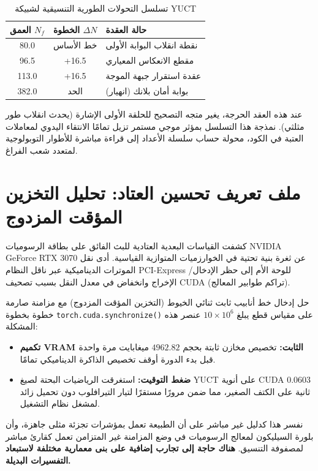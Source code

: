 \documentclass[11pt,a4paper]{article}
\begin{document}
	\begin{table}[h!]
		\centering
		\caption{تسلسل التحولات الطورية التنسيقية لشبيكة YUCT}
		\label{tab:phase_transitions}
		\small
		\begin{tabular}{ccl}
			\toprule
			\textbf{العمق $N_f$} & \textbf{الخطوة $\Delta N$} & \textbf{حالة العقدة} \\
			\midrule
			80.0  & خط الأساس & نقطة انقلاب البوابة الأولى \\
			96.5  & +16.5 & مقطع الانعكاس المعياري \\
			113.0 & +16.5 & عقدة استقرار جبهة الموجة \\
			382.0 & الحد  & بوابة أمان بلانك (انهيار) \\
			\bottomrule
		\end{tabular}
	\end{table}
	
	عند هذه العقد الحرجة، يغير متجه التصحيح للحلقة الأولى الإشارة (يحدث انقلاب طور مثلثي). نمذجة هذا التسلسل بمؤثر موجي مستمر تزيل تمامًا الانتقاء اليدوي لمعاملات العتبة في الكود، محولة حساب سلسلة الأعداد إلى قراءة مباشرة للأطوار التوبولوجية لمتعدد شعب الفراغ.
	
	\section{ملف تعريف تحسين العتاد: تحليل التخزين المؤقت المزدوج}
	كشفت القياسات البعدية العتادية للبث الفائق على بطاقة الرسوميات NVIDIA GeForce RTX 3070 عن ثغرة بنية تحتية في الخوارزميات المتوازية القياسية. أدى نقل الموترات الديناميكية عبر ناقل النظام PCI-Express للوحة الأم إلى حظر الإدخال/الإخراج وانخفاض في معدل النقل بسبب تصحيف CUDA (تراكم طوابير المعالج).
	
	حل إدخال خط أنابيب ثابت ثنائي الخيوط (التخزين المؤقت المزدوج) مع مزامنة صارمة خطوة بخطوة \texttt{torch.cuda.synchronize()} على مقياس قطع يبلغ $10 \times 10^6$ عنصر هذه المشكلة:
	\begin{itemize}
		\item \textbf{تكميم VRAM الثابت:} تخصيص مخازن ثابتة بحجم $4962.82$ ميغابايت مرة واحدة قبل بدء الدورة أوقف تخصيص الذاكرة الديناميكي تمامًا.
		\item \textbf{ضغط التوقيت:} استغرقت الرياضيات البحتة لصيغ YUCT على أنوية CUDA $0.0603$ ثانية على الكتف الصغير، مما ضمن مرورًا مستقرًا لتيار التيرافلوب دون تحميل زائد لمشغل نظام التشغيل.
	\end{itemize}
	نفسر هذا كدليل غير مباشر على أن الطبيعة تعمل بمؤشرات تجزئة مثلى جاهزة، وأن بلورة السيليكون لمعالج الرسوميات في وضع المزامنة غير المتزامن تعمل كقارئ مباشر لمصفوفة التنسيق. \textbf{هناك حاجة إلى تجارب إضافية على بنى معمارية مختلفة لاستبعاد التفسيرات البديلة.}
	
\end{document}

